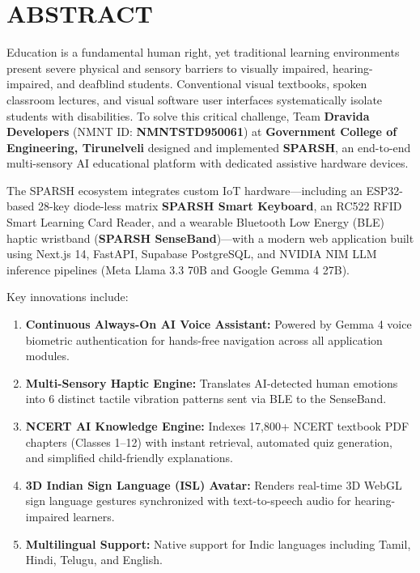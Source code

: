 \documentclass[12pt,a4paper]{report}
\begin{document}
\clearpage
\chapter*{ABSTRACT}

Education is a fundamental human right, yet traditional learning environments present severe physical and sensory barriers to visually impaired, hearing-impaired, and deafblind students. Conventional visual textbooks, spoken classroom lectures, and visual software user interfaces systematically isolate students with disabilities. To solve this critical challenge, Team \textbf{Dravida Developers} (NMNT ID: \textbf{NMNTSTD950061}) at \textbf{Government College of Engineering, Tirunelveli} designed and implemented \textbf{SPARSH}, an end-to-end multi-sensory AI educational platform with dedicated assistive hardware devices.

The SPARSH ecosystem integrates custom IoT hardware---including an ESP32-based 28-key diode-less matrix \textbf{SPARSH Smart Keyboard}, an RC522 RFID Smart Learning Card Reader, and a wearable Bluetooth Low Energy (BLE) haptic wristband (\textbf{SPARSH SenseBand})---with a modern web application built using Next.js 14, FastAPI, Supabase PostgreSQL, and NVIDIA NIM LLM inference pipelines (Meta Llama 3.3 70B and Google Gemma 4 27B).

Key innovations include:
\begin{enumerate}
    \item \textbf{Continuous Always-On AI Voice Assistant:} Powered by Gemma 4 voice biometric authentication for hands-free navigation across all application modules.
    \item \textbf{Multi-Sensory Haptic Engine:} Translates AI-detected human emotions into 6 distinct tactile vibration patterns sent via BLE to the SenseBand.
    \item \textbf{NCERT AI Knowledge Engine:} Indexes 17,800+ NCERT textbook PDF chapters (Classes 1--12) with instant retrieval, automated quiz generation, and simplified child-friendly explanations.
    \item \textbf{3D Indian Sign Language (ISL) Avatar:} Renders real-time 3D WebGL sign language gestures synchronized with text-to-speech audio for hearing-impaired learners.
    \item \textbf{Multilingual Support:} Native support for Indic languages including Tamil, Hindi, Telugu, and English.
\end{enumerate}
\end{document}
